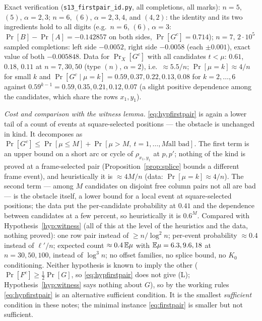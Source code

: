 Exact verification (\texttt{s13\_firstpair\_id.py}, all completions, all
marks): $n=5$, $(5)$, $\alpha=2,3$; $n=6$, $(6)$, $\alpha=2,3,4$, and
$(4,2)$: the identity and its two ingredients hold to all digits (e.g.\
$n=6$, $(6)$, $\alpha=3$: $\Pr[B]-\Pr[A]=-0.142857$ on both sides,
$\Pr[G^c]=0.714$); $n=7$, $2\cdot10^5$ sampled completions:
left side $-0.0052$, right side $-0.0058$ (each $\pm0.001$), exact value
of both $-0.005848$.  Data for $\Pr_X[G^c]$ with all candidates $t<\mu$:
$0.61$, $0.18$, $0.11$ at $n=7,30,50$ (type $(n)$, $\alpha=2$), i.e.\
$\approx5.5/n$; $\Pr[\mu=k]\approx4/n$ for small $k$ and
$\Pr[G^c\mid\mu=k]=0.59,0.37,0.22,0.13,0.08$ for $k=2,\dots,6$ against
$0.59^{k-1}=0.59,0.35,0.21,0.12,0.07$ (a slight positive dependence
among the candidates, which share the rows $x_1,y_1$).

\emph{Cost and comparison with the witness lemma.}
\eqref{eq:hypfirstpair} is again a lower tail of a count of events at
square-selected positions --- the obstacle is unchanged in kind.  It
decomposes as $\Pr[G^c]\le\Pr[\mu\le M]+\Pr[\mu>M,\ t=1,\dots,M\text{
all bad}]$.  The first term is an upper bound on a short arc or cycle
of $\rho_{x_1,y_1}$ at $p,p'$; nothing of the kind is proved at a
frame-selected pair (Proposition~\ref{prop:splice} bounds a different
frame event), and heuristically it is $\approx4M/n$ (data:
$\Pr[\mu=k]\approx4/n$).  The second term --- among $M$ candidates on
disjoint free column pairs not all are bad --- is the obstacle itself,
a lower bound for a local event at square-selected positions; the data
put the per-candidate probability at $0.41$ and the dependence between
candidates at a few percent, so heuristically it is $0.6^M$.  Compared
with Hypothesis~\ref{hyp:witness} (all of this at the level of the
heuristics and the data, nothing proved): one row pair instead of
$\ge n/\log^2n$; per-event probability $\approx0.4$ instead of
$\ell'/n$; expected count $\approx0.4\,\mathbb{E}\mu$ with $\mathbb{E}\mu=6.3,9.6,18$
at $n=30,50,100$, instead of $\log^3n$; no offset families, no splice
bound, no $K_0$ conditioning.  Neither hypothesis is known to imply the
other ($\Pr[F^c]\ge\tfrac12\Pr[G]$, so \eqref{eq:hypfirstpair} does not
give (L); Hypothesis~\ref{hyp:witness} says nothing about $G$), so by
the working rules \eqref{eq:hypfirstpair} is an alternative sufficient
condition.  It is the smallest \emph{sufficient} condition in these
notes; the minimal instance \eqref{eq:firstpair} is smaller but not
sufficient.

